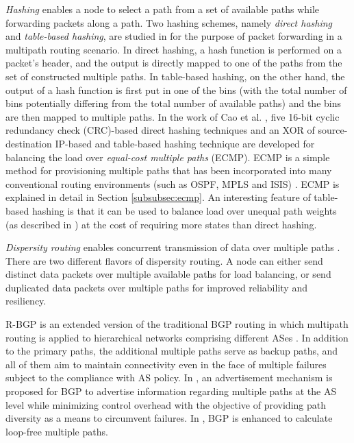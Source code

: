 \documentclass[10pt]{IEEEtran}
\begin{document}
\textit{Hashing} enables a node to select a path from a set of available paths while forwarding packets along a path. Two hashing schemes, namely \textit{direct hashing} and \textit{table-based hashing}, are studied in \cite{cao2000performance} for the purpose of packet forwarding in a multipath routing scenario. In direct hashing, a hash function is performed on a packet's header, and the output is directly mapped to one of the paths from the set of constructed multiple paths. In table-based hashing, on the other hand, the output of a hash function is first put in one of the bins (with the total number of bins potentially differing from the total number of available paths) and the bins are then mapped to multiple paths. In the work of Cao et al. \cite{cao2000performance}, five 16-bit cyclic redundancy check (CRC)-based direct hashing techniques and an XOR of source-destination IP-based and table-based hashing technique are developed for balancing the load over \textit{equal-cost multiple paths} (ECMP). ECMP is a simple method for provisioning multiple paths that has been incorporated into many conventional routing environments (such as OSPF, MPLS and ISIS) \cite{villamizar1999ospf, villamizar1999mpls}. ECMP is explained in detail in Section \ref{subsubsec:ecmp}. An interesting feature of table-based hashing is that it can be used to balance load over unequal path weights (as described in \cite{cao2000performance}) at the cost of requiring more states than direct hashing.

\textit{Dispersity routing} enables concurrent transmission of data over multiple paths \cite{maxemchuk1975}. There are two different flavors of dispersity routing. A node can either send distinct data packets over multiple available paths for load balancing, or send duplicated data packets over multiple paths for improved reliability and resiliency.

R-BGP is an extended version of the traditional BGP routing in which multipath routing is applied to hierarchical networks comprising different ASes \cite{kushman2007r}. In addition to the primary paths, the additional multiple paths serve as backup paths, and all of them aim to maintain connectivity even in the face of multiple failures subject to the compliance with AS policy. In  \cite{wang2009path}, an advertisement mechanism is proposed for BGP to advertise information regarding multiple paths at the AS level \cite{wang2009path} while minimizing control overhead with the objective of providing path diversity as a means to circumvent failures. In \cite{van2009loop}, BGP is enhanced to calculate loop-free multiple paths.
\end{document}
